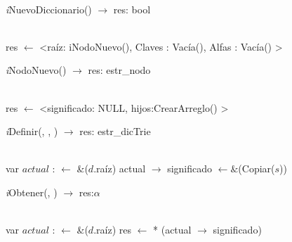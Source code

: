 \begin{Algoritmos}
 \incmargin{1em}
    \dontprintsemicolon
\\
\tab\textit{i}NuevoDiccionario() $\longrightarrow$ res: bool\\
\hspace*{9mm}\\
\begin{algorithm}[H]
	res $\leftarrow$ <raíz: iNodoNuevo(), Claves : Vacía(), Alfas : Vacía() > 
\end{algorithm}

\textit{i}NodoNuevo() $\longrightarrow$ res: estr\_nodo\\
\hspace*{9mm}\\
\begin{algorithm}[H]
	res $\leftarrow$ <significado: NULL, hijos:CrearArreglo() > 
\end{algorithm}

\textit{i}Definir(, , ) $\longrightarrow$ res: estr\_dicTrie\\
\hspace*{9mm}\\
\begin{algorithm}[H]
	var $actual$ :  $\leftarrow$ \&($d$.raíz) 
	actual $\rightarrow$ significado $\leftarrow \&$(Copiar($s$)) 
\end{algorithm}

\textit{i}Obtener(, ) $\longrightarrow$ res:$\alpha$ \\
\hspace*{9mm}\\
\begin{algorithm}[H]
	var $actual$ :  $\leftarrow$ \&($d$.raíz)
	res $\leftarrow$ * (actual $\rightarrow$ significado) 
\end{algorithm}


\end{Algoritmos}

